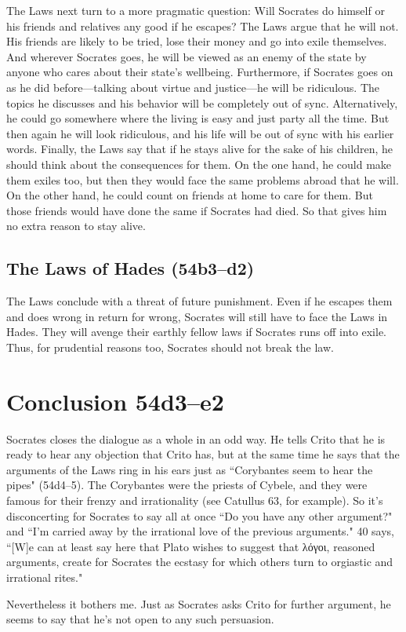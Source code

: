 \documentclass[11pt]{article}
\begin{document}
The Laws next turn to a more pragmatic question: Will Socrates do himself or
his friends and relatives any good if he escapes?  The Laws argue that he will
not.  His friends are likely to be tried, lose their money and go into exile
themselves.  And wherever Socrates goes, he will be viewed as an enemy of the
state by anyone who cares about their state's wellbeing.  Furthermore, if
Socrates goes on as he did before---talking about virtue and justice---he will
be ridiculous.  The topics he discusses and his behavior will be completely out
of sync.  Alternatively, he could go somewhere where the living is easy and
just party all the time.  But then again he will look ridiculous, and his life
will be out of sync with his earlier words.  Finally, the Laws say that if he
stays alive for the sake of his children, he should think about the
consequences for them.  On the one hand, he could make them exiles too, but
then they would face the same problems abroad that he will.  On the other hand,
he could count on friends at home to care for them.  But those friends would
have done the same if Socrates had died.  So that gives him no extra reason to
stay alive.


\subsection{The Laws of Hades (54b3--d2)}

The Laws conclude with a threat of future punishment.  Even if he escapes them
and does wrong in return for wrong, Socrates will still have to face the Laws
in Hades.  They will avenge their earthly fellow laws if Socrates runs off into
exile.  Thus, for prudential reasons too, Socrates should not break the law.



\section{Conclusion 54d3--e2}

Socrates closes the dialogue as a whole in an odd way.  He tells Crito that he
is ready to hear any objection that Crito has, but at the same time he says
that the arguments of the Laws ring in his ears just as ``Corybantes seem to
hear the pipes" (54d4--5).  The Corybantes were the priests of Cybele, and they
were famous for their frenzy and irrationality (see Catullus 63, for example).
So it's disconcerting for Socrates to say all at once ``Do you have any other
argument?" and ``I'm carried away by the irrational love of the previous
arguments."  \citet{rose1983} 40 says, ``[W]e can at least say here that Plato
wishes to suggest that {\g λόγοι}, reasoned arguments, create for Socrates the
ecstasy for which others turn to orgiastic and irrational rites."

Nevertheless it bothers me.  Just as Socrates asks Crito for further argument,
he seems to say that he's not open to any such persuasion.


\newpage


\end{document}
